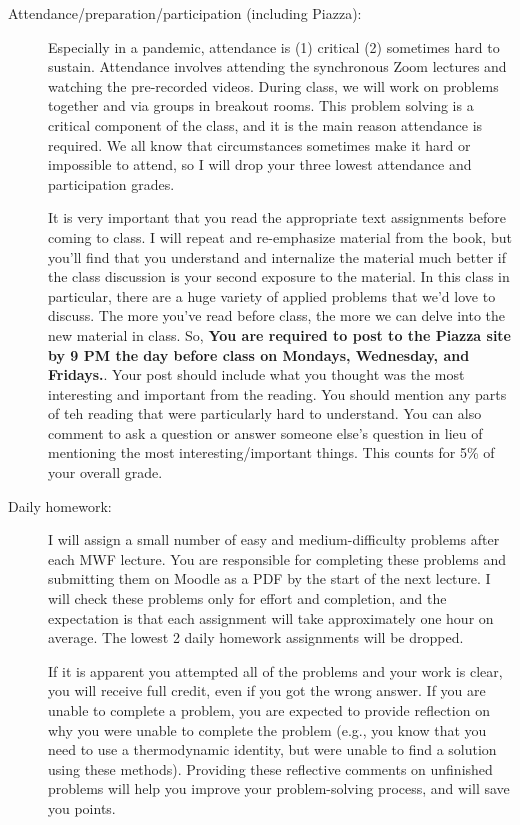 \documentclass[12pt]{article}
\begin{document}
\begin{description}
  
\item[Attendance/preparation/participation (including Piazza):] Especially in a pandemic, attendance is (1) critical (2) sometimes hard to sustain. Attendance involves attending the synchronous Zoom lectures and watching the pre-recorded videos. During class, we will work on problems together and via groups in breakout rooms. This problem solving is a critical component of the class, and it is the main reason attendance is required. We all know that circumstances sometimes make it hard or impossible to attend, so I will drop your three lowest attendance and participation grades.

  It is very important that you read the appropriate text assignments before coming to class. I will repeat and re-emphasize material from the book, but you'll find that you understand and internalize the material much better if the class discussion is your second exposure to the material. In this class in particular, there are a huge variety of applied problems that we'd love to discuss. The more you've read before class, the more we can delve into the new material in class. So, \textbf{You are required to post to the Piazza site by 9 PM the day before class on Mondays, Wednesday, and Fridays.}. Your post should include what you thought was the most interesting and important from the reading. You should mention any parts of teh reading that were particularly hard to understand. You can also comment to ask a question or answer someone else's question in lieu of mentioning the most interesting/important things. This counts for 5\% of your overall grade.

\item[Daily homework:] I will assign a small number of easy and medium-difficulty problems after each MWF lecture. You are responsible for completing these problems and submitting them on Moodle as a PDF by the start of the next lecture. I will check these problems only for effort and completion, and the expectation is that each assignment will take approximately one hour on average. The lowest 2 daily homework assignments will be dropped.

  If it is apparent you attempted all of the problems and your work is clear, you will receive full credit, even if you got the wrong answer. If you are unable to complete a problem, you are expected to provide reflection on why you were unable to complete the problem (e.g., you know that you need to use a thermodynamic identity, but were unable to find a solution using these methods). Providing these reflective comments on unfinished problems will help you improve your problem-solving process, and will save you points.


\end{description}
\end{document}
